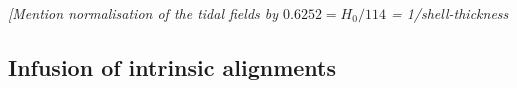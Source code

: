 \documentclass[useAMS,usenatbib]{mn2e}
\begin{document}
{\it [Mention normalisation of the tidal fields by $0.6252 = H_0/114$ = 1/shell-thickness}


\subsection{Infusion of intrinsic alignments}
\label{subsec:IA_infusion}
\end{document}
